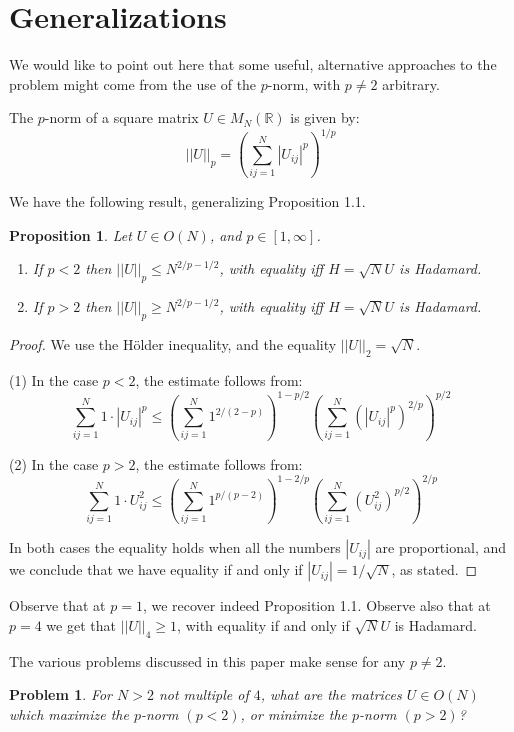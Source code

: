 \documentclass[12pt]{amsart}
\newtheorem{proposition}[theorem]{Proposition}
\newtheorem{problem}[theorem]{Problem}
\begin{document}
\section{Generalizations}

We would like to point out here that some useful, alternative approaches to the problem might come from the use of the $p$-norm, with $p\neq 2$ arbitrary. 

The $p$-norm of a square matrix $U\in M_N(\mathbb R)$ is given by:
$$||U||_p=\left(\sum_{ij=1}^N|U_{ij}|^p\right)^{1/p}$$

We have the following result, generalizing Proposition 1.1.

\begin{proposition}
Let $U\in O(N)$, and $p\in [1,\infty]$.
\begin{enumerate}
\item If $p<2$ then $||U||_p\leq N^{2/p-1/2}$, with equality iff $H=\sqrt{N}U$ is Hadamard.

\item If $p>2$ then $||U||_p\geq N^{2/p-1/2}$, with equality iff $H=\sqrt{N}U$ is Hadamard.
\end{enumerate}
\end{proposition}

\begin{proof}
We use the H\"older inequality, and the equality $||U||_2=\sqrt{N}$.

(1) In the case $p<2$, the estimate follows from:
$$\sum_{ij=1}^N1\cdot|U_{ij}|^p\leq\left(\sum_{ij=1}^N1^{2/(2-p)}\right)^{1-p/2}\left(\sum_{ij=1}^N(|U_{ij}|^p)^{2/p}\right)^{p/2}$$

(2) In the case $p>2$, the estimate follows from:
$$\sum_{ij=1}^N1\cdot U_{ij}^2\leq\left(\sum_{ij=1}^N1^{p/(p-2)}\right)^{1-2/p}\left(\sum_{ij=1}^N(U_{ij}^2)^{p/2}\right)^{2/p}$$
 
In both cases the equality holds when all the numbers $|U_{ij}|$ are proportional, and we conclude that we have equality if and only if $|U_{ij}|=1/\sqrt{N}$, as stated. 
\end{proof}

Observe that at $p=1$, we recover indeed Proposition 1.1. Observe also that at $p=4$ we get that $||U||_4\geq 1$, with equality if and only if $\sqrt{N}U$ is Hadamard.

The various problems discussed in this paper make sense for any $p\neq 2$.

\begin{problem}
For $N>2$ not multiple of $4$, what are the matrices $U\in O(N)$ which maximize the $p$-norm $(p<2)$, or minimize the $p$-norm $(p>2)$? 
\end{problem}
\end{document}
